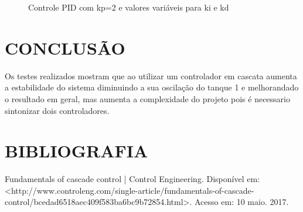 \documentclass[a4paper,12pt]{article}
\begin{document}
\begin{figure}[H]
\hspace{1cm}
     \caption{Controle PID com kp=2 e valores variáveis para ki e kd}
     
\end{figure}

\newpage


\thispagestyle{main}

\section{CONCLUSÃO}

\hspace{4ex}Os testes realizados mostram que ao utilizar um controlador em cascata aumenta a estabilidade do sistema diminuindo a sua oscilação do tanque 1 e melhorandado o resultado em geral, mas aumenta a complexidade do projeto pois é necessario sintonizar dois controladores.

\newpage

\thispagestyle{empty}
\section{BIBLIOGRAFIA}

Fundamentals of cascade control | Control Engineering. Disponível em: <http://www.controleng.com/single-article/fundamentals-of-cascade-control/bcedad6518aec409f583ba6bc9b72854.html>. Acesso em: 10 maio. 2017.





%


%
\end{document}
